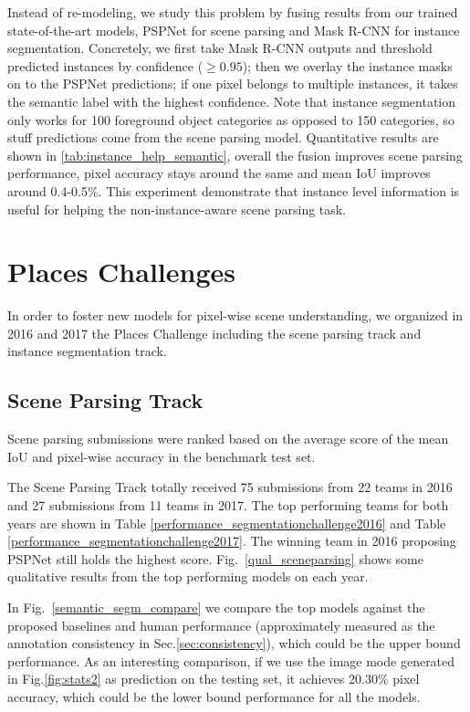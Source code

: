 Instead of re-modeling, we study this problem by fusing results from our trained state-of-the-art models, PSPNet for scene parsing and Mask R-CNN for instance segmentation. Concretely, we first take Mask R-CNN outputs and threshold predicted instances by confidence ($\geq0.95$); then we overlay the instance masks on to the PSPNet predictions; if one pixel belongs to multiple instances, it takes the semantic label with the highest confidence. Note that instance segmentation only works for 100 foreground object categories as opposed to 150 categories, so stuff predictions come from the scene parsing model. Quantitative results are shown in \ref{tab:instance_help_semantic}, overall the fusion improves scene parsing performance, pixel accuracy stays around the same and mean IoU improves around 0.4-0.5\%. This experiment demonstrate that instance level information is useful for helping the non-instance-aware scene parsing task.

\section{Places Challenges}
\label{section:challenges}
In order to foster new models for pixel-wise scene understanding, we organized in 2016 and 2017 the Places Challenge including the scene parsing track and instance segmentation track. 

\subsection{Scene Parsing Track}

Scene parsing submissions were ranked based on the average score of the mean IoU and pixel-wise accuracy in the benchmark test set. 

The Scene Parsing Track totally received 75 submissions from 22 teams in 2016 and 27 submissions from 11 teams in 2017. The top performing teams for both years are shown in Table \ref{performance_segmentationchallenge2016} and Table \ref{performance_segmentationchallenge2017}. The winning team in 2016 proposing PSPNet \cite{zhao2017pyramid} still holds the highest score. Fig.~\ref{qual_sceneparsing} shows some qualitative results from the top performing models on each year. 

In Fig.~\ref{semantic_segm_compare} we compare the top models against the proposed baselines and human performance (approximately measured as the annotation consistency in Sec.\ref{sec:consistency}), which could be the upper bound performance. As an interesting comparison, if we use the image mode generated in Fig.\ref{fig:stats2} as prediction on the testing set, it achieves 20.30\% pixel accuracy, which could be the lower bound performance for all the models.

